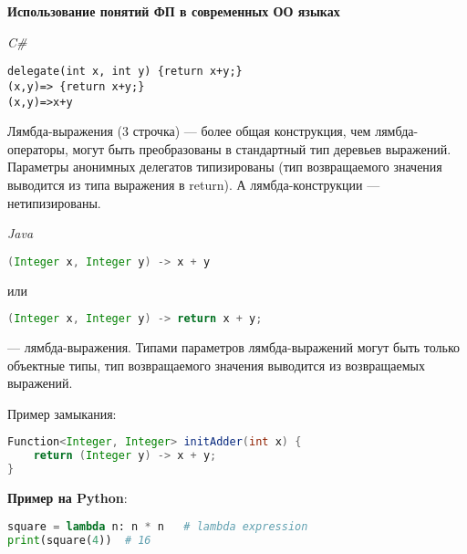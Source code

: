\textbf{Использование понятий ФП в современных ОО языках}

\textit{C\#}

\begin{lstlisting}
delegate(int x, int y) {return x+y;}
(x,y)=> {return x+y;}
(x,y)=>x+y
\end{lstlisting}

Лямбда-выражения (3 строчка) --- более общая конструкция, чем лямбда-операторы, могут быть преобразованы в стандартный тип деревьев выражений. 
Параметры анонимных делегатов типизированы (тип возвращаемого значения выводится из типа выражения в return). 
А лямбда-конструкции --- нетипизированы.

\textit{Java}

\begin{lstlisting}[language=Java]
(Integer x, Integer y) -> x + y 
\end{lstlisting}
или
\begin{lstlisting}[language=Java]
(Integer x, Integer y) -> return x + y; 
\end{lstlisting}
--- лямбда-выражения. 
Типами параметров лямбда-выражений могут быть только объектные типы, тип возвращаемого значения выводится из возвращаемых выражений.

Пример замыкания:

\begin{lstlisting}[language=Java]
Function<Integer, Integer> initAdder(int x) {
    return (Integer y) -> x + y;
}
\end{lstlisting}

\textbf{Пример на Python}:

\begin{lstlisting}[language=Python]
square = lambda n: n * n   # lambda expression
print(square(4))  # 16
\end{lstlisting}

